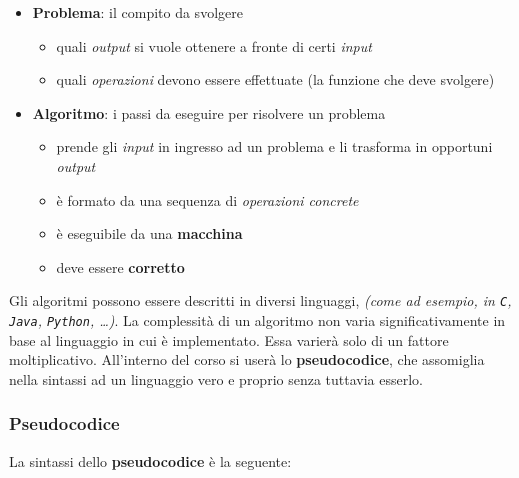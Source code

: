 \documentclass[italian, 10pt]{article}
\begin{document}
\begin{itemize}
  \item \textbf{Problema}: il compito da svolgere
        \begin{itemize}
          \item quali \textit{output} si vuole ottenere a fronte di certi \textit{input}
          \item quali \textit{operazioni} devono essere effettuate (la funzione che deve svolgere)
        \end{itemize}
  \item \textbf{Algoritmo}: i passi da eseguire per risolvere un problema
        \begin{itemize}
          \item prende gli \textit{input} in ingresso ad un problema e li trasforma in opportuni \textit{output}
          \item è formato da una sequenza di \textit{operazioni concrete}
          \item è eseguibile da una \textbf{macchina}
          \item deve essere \textbf{corretto}
        \end{itemize}
\end{itemize}

Gli algoritmi possono essere descritti in diversi linguaggi, \textit{(come ad esempio, in \texttt{C}, \texttt{Java}, \texttt{Python}, \ldots)}.
La complessità di un algoritmo non varia significativamente in base al linguaggio in cui è implementato. Essa varierà solo di un fattore moltiplicativo.
All'interno del corso si userà lo \textbf{pseudocodice}, che assomiglia nella sintassi ad un linguaggio vero e proprio senza tuttavia esserlo.

\subsubsection{Pseudocodice}

La sintassi dello \textbf{pseudocodice} è la seguente:
\end{document}
